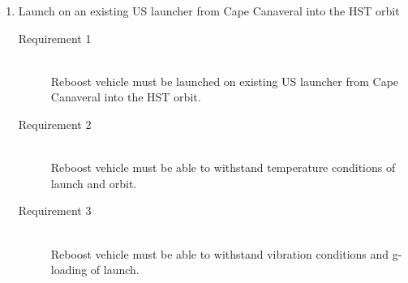 \documentclass[onecolumn,10pt]{jhwhw}
\begin{document}
\begin{enumerate}
\item Launch on an existing US launcher from Cape Canaveral into the HST orbit
\begin{description}
  \item[Requirement 1] \hfill \\
  Reboost vehicle must be launched on existing US launcher from Cape Canaveral into the HST orbit.

  \item[Requirement 2] \hfill \\
  Reboost vehicle must be able to withstand temperature conditions of launch and orbit.
  \item[Requirement 3] \hfill \\
  Reboost vehicle must be able to withstand vibration conditions and g-loading of launch.


\end{description}
\end{enumerate}
\end{document}
